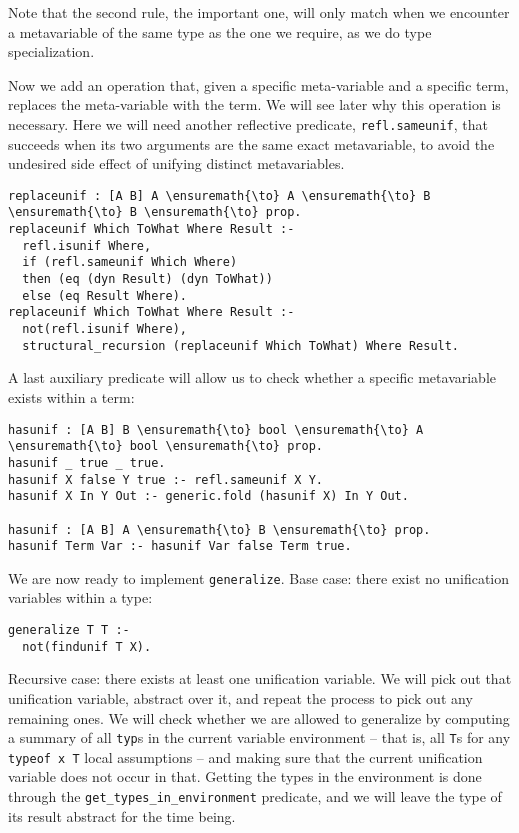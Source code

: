 Note that the second rule, the important one, will only match when we
encounter a metavariable of the same type as the one we require, as we
do type specialization.

Now we add an operation that, given a specific meta-variable and a
specific term, replaces the meta-variable with the term. We will see
later why this operation is necessary. Here we will need another
reflective predicate, \texttt{refl.sameunif}, that succeeds when its two
arguments are the same exact metavariable, to avoid the undesired side
effect of unifying distinct metavariables.

\begin{verbatim}
replaceunif : [A B] A \ensuremath{\to} A \ensuremath{\to} B \ensuremath{\to} B \ensuremath{\to} prop.
replaceunif Which ToWhat Where Result :-
  refl.isunif Where,
  if (refl.sameunif Which Where)
  then (eq (dyn Result) (dyn ToWhat))
  else (eq Result Where).
replaceunif Which ToWhat Where Result :-
  not(refl.isunif Where),
  structural_recursion (replaceunif Which ToWhat) Where Result.
\end{verbatim}

A last auxiliary predicate will allow us to check whether a specific
metavariable exists within a term:

\begin{verbatim}
hasunif : [A B] B \ensuremath{\to} bool \ensuremath{\to} A \ensuremath{\to} bool \ensuremath{\to} prop.
hasunif _ true _ true.
hasunif X false Y true :- refl.sameunif X Y.
hasunif X In Y Out :- generic.fold (hasunif X) In Y Out.

hasunif : [A B] A \ensuremath{\to} B \ensuremath{\to} prop.
hasunif Term Var :- hasunif Var false Term true.
\end{verbatim}

We are now ready to implement \texttt{generalize}. Base case: there
exist no unification variables within a type:

\begin{verbatim}
generalize T T :- 
  not(findunif T X).
\end{verbatim}

Recursive case: there exists at least one unification variable. We will
pick out that unification variable, abstract over it, and repeat the
process to pick out any remaining ones. We will check whether we are
allowed to generalize by computing a summary of all \texttt{typ}s in the
current variable environment -- that is, all \texttt{T}s for any
\texttt{typeof\ x\ T} local assumptions -- and making sure that the
current unification variable does not occur in that. Getting the types
in the environment is done through the
\texttt{get\_types\_in\_environment} predicate, and we will leave the
type of its result abstract for the time being.

